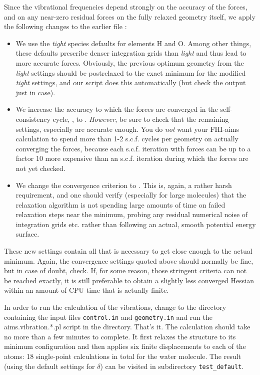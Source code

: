 Since the vibrational frequencies depend strongly on the accuracy
of the forces, and on any near-zero residual forces on the fully
relaxed geometry itself, we apply the following changes to the
earlier file : 
\begin{itemize}
\item We use the \emph{tight} species defaults for elements H and
  O. Among other things, these defaults prescribe denser integration
  grids than \emph{light} and thus lead to more accurate
  forces. Obviously, the previous optimum geometry from the
  \emph{light} settings should be postrelaxed to the exact minimum for
  the modified \emph{tight} settings, and our script does this
  automatically (but check the output just in case).
\item We increase the accuracy to which the forces are converged in
  the self-consistency cycle, , to
  . \emph{However}, be sure to check that the remaining
  settings, especially  are accurate
  enough. You do \emph{not} want your FHI-aims calculation to spend
  more than 1-2 s.c.f. cycles per geometry on actually converging the
  forces, because each s.c.f. iteration with forces can be up to a
  factor 10 more expensive than an s.c.f. iteration during which the
  forces are not yet checked.
\item We change the  
  convergence criterion to
  . This is, again, a rather harsh requirement, and one
  should verify (especially for large molecules) that the
  relaxation algorithm is not spending large amounts of time on
  failed relaxation steps near the minimum, probing any residual
  numerical noise of integration grids etc. rather than following an
  actual, smooth potential energy surface.
\end{itemize}
These new settings contain all that is necessary to get close enough
to the actual minimum. Again, the convergence settings quoted above
should normally be fine, but in case of doubt, check. If, for some
reason, those stringent criteria can not be reached exactly, it is
still preferable to obtain a slightly less converged Hessian within an
amount of CPU time that is actually finite.

In order to run the calculation of the vibrations, change to the
directory containing the input files \texttt{control.in} and
\texttt{geometry.in} and run the aims.vibration.*.pl script in the
directory. That's it. The calculation should take no more than a few
minutes to complete. It first relaxes the structure to its minimum
configuration and then applies six finite displacements to each of the
atoms: 18 single-point calculations in total for the water
molecule. The result (using the default settings for $\delta$) can be
visited in subdirectory \texttt{test\_default}.

